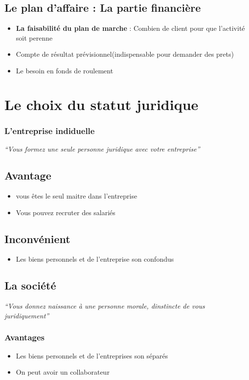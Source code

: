 \documentclass[12pt,a4paper,openany]{report}
\begin{document}
		\subsection{Le plan d'affaire : La partie financière}
		\begin{itemize}
			\item \textbf{La faisabilité du plan de marche} : Combien de client pour que l'activité soit perenne
			\item Compte de résultat prévisionnel(indispensable pour demander des prets)
			\item Le besoin en fonds de roulement
		\end{itemize}
	\section{Le choix du statut juridique}
			\subsubsection{L'entreprise indiduelle}
			\textit{``Vous formez une seule personne juridique avec votre entreprise''}
			\newpage
			\subsection{Avantage}
				\begin{itemize}
					\item vous êtes le seul maitre dans l'entreprise
					\item Vous pouvez recruter des salariés
				\end{itemize}
			\subsection{Inconvénient}
				\begin{itemize}
					\item Les biens personnels et de l'entreprise son confondus
				\end{itemize}
			\subsection{La société}
			\textit{``Vous donnez naissance à une personne morale, dinstincte de vous juridiquement''}
			\subsubsection{Avantages}
				\begin{itemize}
					\item Les biens personnels et de l'entreprises son séparés
					\item On peut avoir un collaborateur
				\end{itemize}
\end{document}
